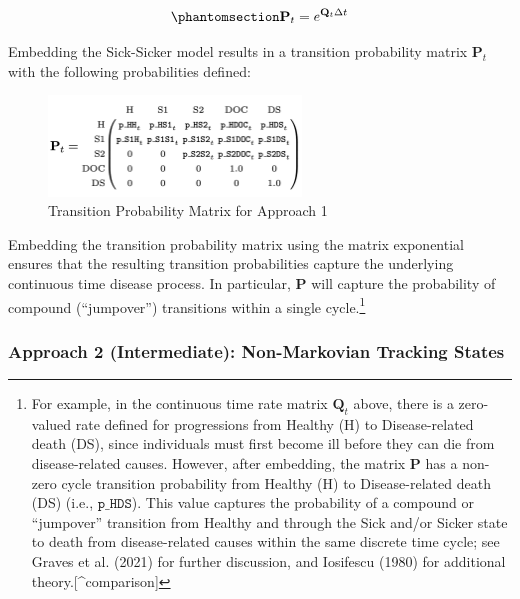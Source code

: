 \documentclass[
]{agujournal2019}
\begin{document}
\begin{equation}\phantomsection\label{eq-embed}{
\mathbf{P}_t = e^{\mathbf{Q}_t\Delta t}
}\end{equation}

Embedding the Sick-Sicker model results in a transition probability
matrix \(\mathbf{P}_t\) with the following probabilities defined:

\begin{figure}[H]

{\centering \includegraphics[width=0.6\textwidth,height=\textheight]{images/P_model2.png}

}

\caption{Transition Probability Matrix for Approach 1}

\end{figure}%

Embedding the transition probability matrix using the matrix exponential
ensures that the resulting transition probabilities capture the
underlying continuous time disease process. In particular,
\(\mathbf{P}\) will capture the probability of compound (``jumpover'')
transitions within a single cycle.\footnote{For example, in the
  continuous time rate matrix \(\mathbf{Q}_t\) above, there is a
  zero-valued rate defined for progressions from Healthy (H) to
  Disease-related death (DS), since individuals must first become ill
  before they can die from disease-related causes. However, after
  embedding, the matrix \(\mathbf{P}\) has a non-zero cycle transition
  probability from Healthy (H) to Disease-related death (DS) (i.e.,
  \(\texttt{p\_HDS}\)). This value captures the probability of a
  compound or ``jumpover'' transition from Healthy and through the Sick
  and/or Sicker state to death from disease-related causes within the
  same discrete time cycle; see Graves et al. (2021) for further
  discussion, and Iosifescu (1980) for additional
  theory.{[}\^{}comparison{]}}

\subsubsection{Approach 2 (Intermediate): Non-Markovian Tracking
States}\label{approach-2-intermediate-non-markovian-tracking-states}
\end{document}
